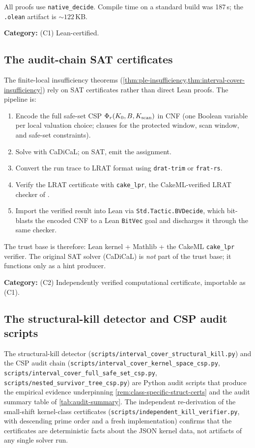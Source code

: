 All proofs use \texttt{native\_decide}. Compile time on a standard
build was 187\,s; the \texttt{.olean} artifact is $\sim 122$\,KB.

\textbf{Category:} (C1) Lean-certified.

\subsection{The audit-chain SAT certificates}
\label{sec:lean-sat}

The finite-local insufficiency theorems
(\cref{thm:ple-insufficiency,thm:interval-cover-insufficiency}) rely
on SAT certificates rather than direct Lean proofs. The pipeline is:

\begin{enumerate}[leftmargin=*]
\item Encode the full safe-set CSP $\Phi_r(K_0, B, K_{\rm scan})$ in
  CNF (one Boolean variable per local valuation choice; clauses for
  the protected window, scan window, and safe-set constraints).
\item Solve with CaDiCaL; on SAT, emit the assignment.
\item Convert the run trace to LRAT format using \texttt{drat-trim}
  or \texttt{frat-rs}.
\item Verify the LRAT certificate with \texttt{cake\_lpr}, the
  CakeML-verified LRAT checker of \cite{TanHeuleMyreen2021}.
\item Import the verified result into Lean via
  \texttt{Std.Tactic.BVDecide}, which bit-blasts the encoded CNF
  to a Lean \texttt{BitVec} goal and discharges it through the
  same checker.
\end{enumerate}

The trust base is therefore: Lean kernel + Mathlib + the CakeML
\texttt{cake\_lpr} verifier. The original SAT solver (CaDiCaL) is
\emph{not} part of the trust base; it functions only as a hint
producer.

\textbf{Category:} (C2) Independently verified computational
certificate, importable as (C1).

\subsection{The structural-kill detector and CSP audit scripts}
\label{sec:lean-audit-scripts}

The structural-kill detector
(\texttt{scripts/interval\_cover\_structural\_kill.py}) and the CSP
audit chain
(\texttt{scripts/interval\_cover\_kernel\_space\_csp.py},
\texttt{scripts/interval\_cover\_full\_safe\_set\_csp.py},
\texttt{scripts/nested\_survivor\_tree\_csp.py}) are Python audit
scripts that produce the empirical evidence underpinning
\cref{rem:class-specific-struct-certs} and the audit summary
table of \cref{tab:audit-summary}. The independent re-derivation of
the small-shift kernel-class certificates
(\texttt{scripts/independent\_kill\_verifier.py}, with descending
prime order and a fresh implementation) confirms that the certificates
are deterministic facts about the JSON kernel data, not artifacts of
any single solver run.

